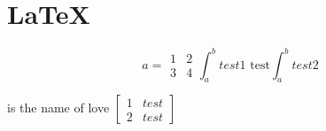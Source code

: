 \documentclass{article}
\begin{document}
\section{\LaTeX}
\begin{equation}
    a = 
    \begin{matrix}
        1 & 2 \\
        3 & 4
    \end{matrix}
    \int_a^b test1 \text{ test}
    \int^b_a test2
\end{equation}

is the name of love
$\begin{bmatrix}
    1 & test \\
    2 & test
\end{bmatrix}$
    
\end{document}
